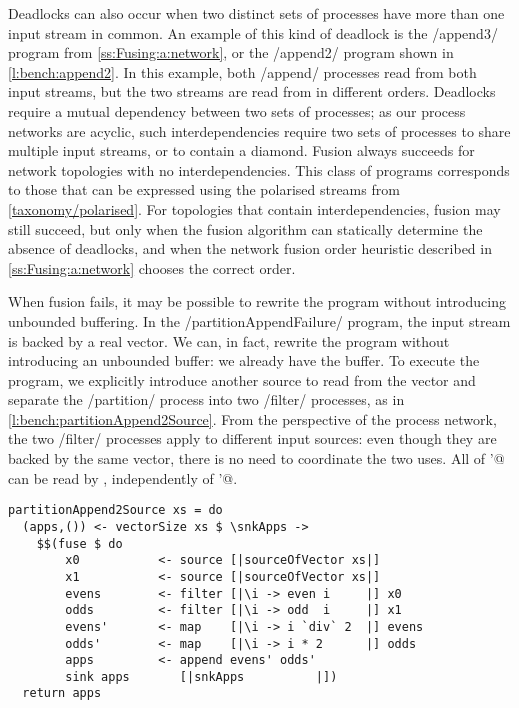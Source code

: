 Deadlocks can also occur when two distinct sets of processes have more than one input stream in common.
An example of this kind of deadlock is the \Hs/append3/ program from \cref{ss:Fusing:a:network}, or the \Hs/append2/ program shown in \cref{l:bench:append2}.
In this example, both \Hs/append/ processes read from both input streams, but the two streams are read from in different orders.
Deadlocks require a mutual dependency between two sets of processes; as our process networks are acyclic, such interdependencies require two sets of processes to share multiple input streams, or to contain a diamond.
Fusion always succeeds for network topologies with no interdependencies.
This class of programs corresponds to those that can be expressed using the polarised streams from \cref{taxonomy/polarised}.
For topologies that contain interdependencies, fusion may still succeed, but only when the fusion algorithm can statically determine the absence of deadlocks, and when the network fusion order heuristic described in \cref{ss:Fusing:a:network} chooses the correct order.

When fusion fails, it may be possible to rewrite the program without introducing unbounded buffering.
In the \Hs/partitionAppendFailure/ program, the input stream is backed by a real vector.
We can, in fact, rewrite the program without introducing an unbounded buffer: we already have the buffer.
To execute the program, we explicitly introduce another source to read from the vector and separate the \Hs/partition/ process into two \Hs/filter/ processes, as in \cref{l:bench:partitionAppend2Source}.
From the perspective of the process network, the two \Hs/filter/ processes apply to different input sources: even though they are backed by the same vector, there is no need to coordinate the two uses.
All of \Hs@evens'@ can be read by \Hs@append@, independently of \Hs@odds'@.

\begin{lstlisting}[float,label=l:bench:partitionAppend2Source,caption=Partition / append with two sources]
partitionAppend2Source xs = do
  (apps,()) <- vectorSize xs $ \snkApps ->
    $$(fuse $ do
        x0           <- source [|sourceOfVector xs|]
        x1           <- source [|sourceOfVector xs|]
        evens        <- filter [|\i -> even i     |] x0
        odds         <- filter [|\i -> odd  i     |] x1
        evens'       <- map    [|\i -> i `div` 2  |] evens
        odds'        <- map    [|\i -> i * 2      |] odds
        apps         <- append evens' odds'
        sink apps       [|snkApps          |])
  return apps
\end{lstlisting}

